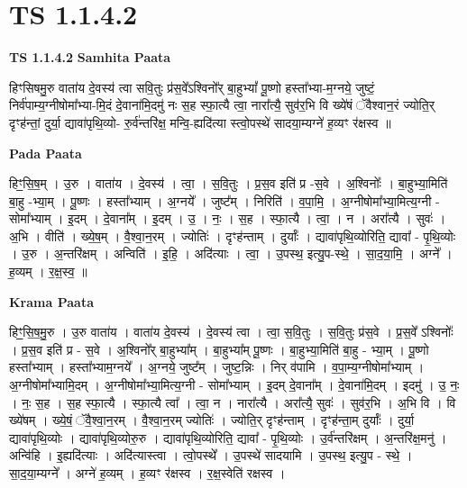 \documentclass[17pt]{extarticle}
\begin{document}
\section{ TS 1.1.4.2 }

\textbf{TS 1.1.4.2 } \newline
\textbf{Samhita Paata} \newline

हिꣳसिषमु॒रु वाता॑य दे॒वस्य॑ त्वा सवि॒तुः प्र॑स॒वे᳚ऽश्विनो᳚र् बा॒हुभ्यां᳚ पू॒ष्णो हस्ता᳚भ्या-म॒ग्नये॒ जुष्टं॒ निर्व॑पाम्य॒ग्नीषोमा᳚भ्या-मि॒दं दे॒वाना॑मि॒दमु॑ नः स॒ह स्फा॒त्यै त्वा॒ नारा᳚त्यै॒ सुव॑र॒भि वि ख्ये॑षं ॅवैश्वान॒रं ज्योति॒र् दृꣳह॑न्तां॒ दुर्या॒ द्यावा॑पृथि॒व्यो- रु॒र्व॑न्तरि॑क्ष॒ मन्वि॒-ह्यदि॑त्या स्त्वो॒पस्थे॑ सादया॒म्यग्ने॑ ह॒व्यꣳ र॑क्षस्व ॥ \newline

\textbf{Pada Paata} \newline

हिꣳ॒॒सि॒ष॒म् । उ॒रु । वाता॑य । दे॒वस्य॑ । त्वा॒ । स॒वि॒तुः । प्र॒स॒व इति॑ प्र -स॒वे । अ॒श्विनोः᳚ । बा॒हुभ्या॒मिति॑ बा॒हु -भ्या॒म् । पू॒ष्णः । हस्ता᳚भ्याम् । अ॒ग्नये᳚ । जुष्ट᳚म् । निरिति॑ । व॒पा॒मि॒ । अ॒ग्नीषोमा᳚भ्या॒मित्य॒ग्नी - सोमा᳚भ्याम् । इ॒दम् । दे॒वाना᳚म् । इ॒दम् । उ॒ । नः॒ । स॒ह । स्फा॒त्यै । त्वा॒ । न । अरा᳚त्यै । सुवः॑ । अ॒भि । वीति॑ । ख्ये॒ष॒म् । वै॒श्वा॒न॒रम् । ज्योतिः॑ । दृꣳह॑न्ताम् । दुर्याः᳚ । द्यावा॑पृथि॒व्योरिति॒ द्यावा᳚ - पृ॒थि॒व्योः । उ॒रु । अ॒न्तरि॑क्षम् । अन्विति॑ । इ॒हि॒ । अदि॑त्याः । त्वा॒ । उ॒पस्थ॒ इत्यु॒प-स्थे॒ । सा॒द॒या॒मि॒ । अग्ने᳚ । ह॒व्यम् । र॒क्ष॒स्व॒ ॥  \newline


\textbf{Krama Paata} \newline

हिꣳ॒॒॒सि॒ष॒मु॒रु । उ॒रु वाता॑य । वाता॑य दे॒वस्य॑ । दे॒वस्य॑ त्वा । त्वा॒ स॒वि॒तुः । स॒वि॒तुः प्र॑स॒वे । प्र॒स॒वे᳚ ऽश्विनोः᳚ । प्र॒स॒व इति॑ प्र - स॒वे । अ॒श्विनो᳚र् बा॒हुभ्या᳚म् । बा॒हुभ्या᳚म् पू॒ष्णः । बा॒हुभ्या॒मिति॑ बा॒हु - भ्या॒म् । पू॒ष्णो हस्ता᳚भ्याम् । हस्ता᳚भ्याम॒ग्नये᳚ । अ॒ग्नये॒ जुष्ट᳚म् । जुष्ट॒न्निः । निर् व॑पामि । व॒पा॒म्य॒ग्नीषोमा᳚भ्याम् । अ॒ग्नीषोमा᳚भ्यामि॒दम् । अ॒ग्नीषोमा᳚भ्या॒मित्य॒ग्नी - सोमा᳚भ्याम् । इ॒दम् दे॒वाना᳚म् । दे॒वाना॑मि॒दम् । इदमु॑ । उ॒ नः॒ । नः॒ स॒ह । स॒ह स्फा॒त्यै । स्फा॒त्यै त्वा᳚ । त्वा॒ न । नारा᳚त्यै । अरा᳚त्यै॒ सुवः॑ । सुव॑र॒भि । अ॒भि वि । वि ख्ये॑षम् । ख्ये॒षं॒ ॅवै॒श्वा॒न॒रम् । वै॒श्वा॒न॒रम् ज्योतिः॑ । ज्योति॒र् दृꣳह॑न्ताम् । दृꣳह॑न्ता॒म् दुर्याः᳚ । दुर्या॒ द्यावा॑पृथि॒व्योः । द्यावा॑पृथि॒व्योरु॒रु । द्यावा॑पृथि॒व्योरिति॒ द्यावा᳚ - पृ॒थि॒व्योः । उ॒र्व॑न्तरि॑क्षम् । अ॒न्तरि॑क्ष॒मनु॑ । अन्वि॑हि । इ॒ह्यदि॑त्याः । 
अदि॑त्यास्त्वा । त्वो॒पस्थे᳚ । उ॒पस्थे॑ सादयामि । उ॒पस्थ॒ इत्यु॒प - स्थे॒ । सा॒द॒या॒म्यग्ने᳚ । अग्ने॑ ह॒व्यम् । ह॒व्यꣳ र॑क्षस्व । र॒क्ष॒स्वेति॑ रक्षस्व । \newline
\end{document}
